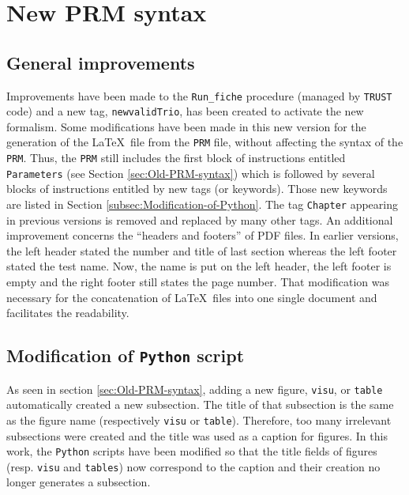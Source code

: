 \section{\label{sec:New-PRM-syntax}New \textsf{PRM} syntax}

\subsection{\label{subsec:General-improvements}General improvements}
Improvements have been made to the \texttt{Run\_fiche} procedure (managed
by \texttt{TRUST} code) and a new tag, \texttt{newvalidTrio}, has
been created to activate the new formalism. Some modifications have
been made in this new version for the generation of the \LaTeX~file from
the \texttt{PRM} file, without affecting the syntax of the \texttt{PRM}.
Thus, the \texttt{PRM} still includes the first block of instructions
entitled \texttt{Parameters} (see Section \ref{sec:Old-PRM-syntax})
which is followed by several blocks of instructions entitled by new
tags (or keywords). Those new keywords are listed in Section \ref{subsec:Modification-of-Python}.
The tag \texttt{Chapter} appearing in previous versions is removed and replaced
by many other tags. An additional improvement concerns the ``headers
and footers'' of PDF files. In earlier versions, the left header stated
the number and title of last section whereas the left footer stated
the test name. Now, the name is put on the left header, the left footer
is empty and the right footer still states the page number. That modification
was necessary for the concatenation of \LaTeX~files into one single
document and facilitates the readability.

\subsection{\label{subsec:Modification-of-Python}Modification of \texttt{Python}
script}
As seen in section \ref{sec:Old-PRM-syntax}, adding a new figure,
\texttt{visu}, or \texttt{table} automatically created
a new subsection. The title of that subsection is the same as the
figure name (respectively \texttt{visu} or \texttt{table}). Therefore,
too many irrelevant subsections were created and the title was used
as a caption for figures. In this work, the \texttt{Python} scripts
have been modified so that the title fields of figures (resp. \texttt{visu}
and \texttt{tables}) now correspond to the caption and their creation
no longer generates a subsection.\medskip\newline

